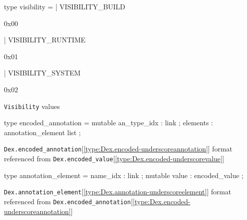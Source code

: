 \documentclass[11pt]{article}
\begin{document}
\label{type:Dex.visibility}\begin{ocamldoccode}
type visibility =
  | VISIBILITY_BUILD
\end{ocamldoccode}
\begin{ocamldoccomment}
0x00
\end{ocamldoccomment}
\begin{ocamldoccode}
  | VISIBILITY_RUNTIME
\end{ocamldoccode}
\begin{ocamldoccomment}
0x01
\end{ocamldoccomment}
\begin{ocamldoccode}
  | VISIBILITY_SYSTEM
\end{ocamldoccode}
\begin{ocamldoccomment}
0x02
\end{ocamldoccomment}
\begin{ocamldocdescription}
{\tt{Visibility}} values


\end{ocamldocdescription}




\label{type:Dex.encoded-underscoreannotation}\begin{ocamldoccode}
type encoded_annotation = {}
  mutable an_type_idx : link ;
  elements : annotation_element list ;
{}
\end{ocamldoccode}
\begin{ocamldocdescription}
{\tt{Dex.encoded\_annotation}}[\ref{type:Dex.encoded-underscoreannotation}] format referenced from {\tt{Dex.encoded\_value}}[\ref{type:Dex.encoded-underscorevalue}]


\end{ocamldocdescription}




\label{type:Dex.annotation-underscoreelement}\begin{ocamldoccode}
type annotation_element = {}
  name_idx : link ;
  mutable value : encoded_value ;
{}
\end{ocamldoccode}
\begin{ocamldocdescription}
{\tt{Dex.annotation\_element}}[\ref{type:Dex.annotation-underscoreelement}] format referenced from {\tt{Dex.encoded\_annotation}}[\ref{type:Dex.encoded-underscoreannotation}]


\end{ocamldocdescription}
\end{document}
